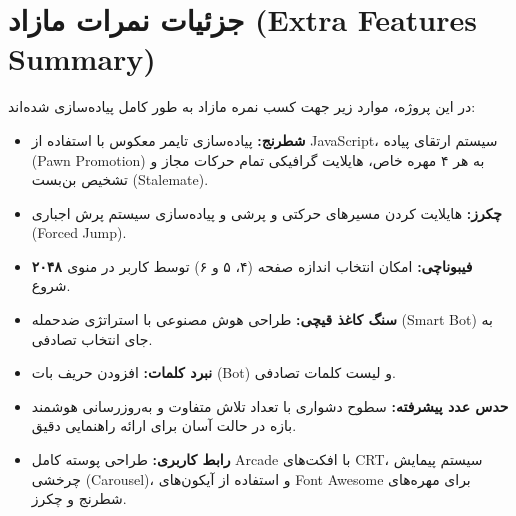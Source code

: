 \documentclass[12pt, a4paper]{article}
\begin{document}
\section{جزئیات نمرات مازاد (Extra Features Summary)}
در این پروژه، موارد زیر جهت کسب نمره مازاد به طور کامل پیاده‌سازی شده‌اند:
\begin{itemize}
    \item \textbf{شطرنج:} پیاده‌سازی تایمر معکوس با استفاده از JavaScript، سیستم ارتقای پیاده (Pawn Promotion) به هر ۴ مهره خاص، هایلایت گرافیکی تمام حرکات مجاز و تشخیص بن‌بست (Stalemate).
    \item \textbf{چکرز:} هایلایت کردن مسیرهای حرکتی و پرشی و پیاده‌سازی سیستم پرش اجباری (Forced Jump).
    \item \textbf{۲۰۴۸ فیبوناچی:} امکان انتخاب اندازه صفحه (۴، ۵ و ۶) توسط کاربر در منوی شروع.
    \item \textbf{سنگ کاغذ قیچی:} طراحی هوش مصنوعی با استراتژی ضدحمله (Smart Bot) به جای انتخاب تصادفی.
    \item \textbf{نبرد کلمات:} افزودن حریف بات (Bot) و لیست کلمات تصادفی.
    \item \textbf{حدس عدد پیشرفته:} سطوح دشواری با تعداد تلاش متفاوت و به‌روزرسانی هوشمند بازه در حالت آسان برای ارائه راهنمایی دقیق.
    \item \textbf{رابط کاربری:} طراحی پوسته کامل Arcade با افکت‌های CRT، سیستم پیمایش چرخشی (Carousel)، و استفاده از آیکون‌های Font Awesome برای مهره‌های شطرنج و چکرز.
\end{itemize}
\end{document}
